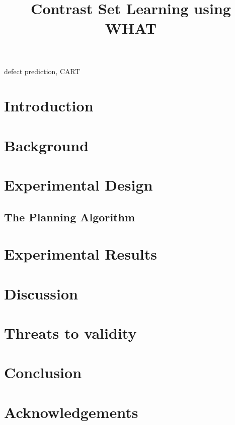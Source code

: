 \documentclass[conference]{IEEEtran}
\begin{document}
  \title{Contrast Set Learning using WHAT}
  
  \author{
    \and
    }
  
  \maketitle
  
  
  \begin{abstract}
 
  \end{abstract}
  \begin{keywords}
    defect prediction, CART
  \end{keywords}
  
\section{Introduction}
\section{Background}
\section{Experimental Design}
\subsection{The Planning Algorithm}

\section{Experimental Results}
\section{Discussion}
\section{Threats to validity}
\section{Conclusion}
\section*{Acknowledgements}
\begin{thebibliography}{10}
\end{thebibliography}
\end{document}
